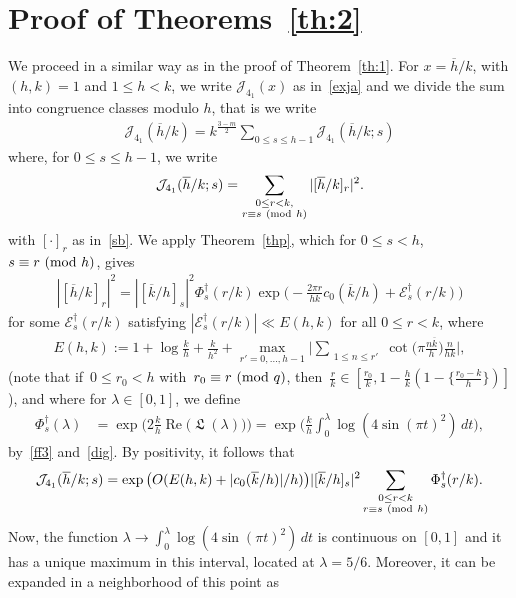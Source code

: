 \documentclass[11pt]{amsart}
\newcommand{\J}{\mathcal{J}}
\renewcommand{\mod}[1]{~\pr{\textnormal{mod}~#1}}
\newcommand{\Er}{{\mathcal E}}
\theoremstyle{definition}
\newcommand{\ssum}[1]{\sum_{\substack{#1}}}
\newcommand{\pr}[1]{\mathchoice{\left( #1\right)}{(#1)}{(#1)}{(#1)}}
\DeclareMathOperator{\Lie}{{\mathfrak L}}
\renewcommand\Re{\operatorname{Re}}
\newcommand{\1}{{\mathbf 1}}
\renewcommand{\bar}[1]{\overline{#1}}
\let\originalleft\left
\let\originalright\right
\renewcommand{\left}{\mathopen{}\mathclose\bgroup\originalleft}
\renewcommand{\right}{\aftergroup\egroup\originalright}
\numberwithin{equation}{section}
\begin{document}
\section{Proof of Theorems~\ref{th:2}}\label{pmt2}
We proceed in a similar way as in the proof of Theorem~\ref{th:1}. For $x=\bar h/k$, with $(h,k)=1$ and $1\leq h<k$, we write $ \J_{4_1}( x)$ as in~\eqref{exja} and we divide the sum into congruence classes modulo $h$, that is we write
\begin{align}\label{splj2}
  \J_{4_1}(\bar h/k) = k^{\frac{3-m}2} \sum_{0\leq s\leq h-1}\J_{4_1}(\bar h/k; s)
\end{align}
where, for $0\leq s\leq h-1$, we write
\begin{align}\label{splik2}
  \J_{4_1}(\bar h/k; s) =   \ssum{0\leq r<k,\\ r\equiv s \mod{h}}{| [ \bar h/k]_{r}|^2}.
\end{align}
with $[\cdot]_r$ as in~\eqref{sb}. We apply Theorem~\ref{thp}, which for $0\leq s<h$, $s\equiv r\mod h$, gives
\begin{align}\label{arf2}
  | [\overline{h}/k]_{r}|^2 = | [\bar k/h]_{s}|^2 \Phi_s^\dagger(r /k)\exp\Big(- \frac {2\pi r}{hk}c_0({\overline k}/h)+\Er^\dagger_s(r/k)\Big)
\end{align}
for some $\Er^\dagger_s(r/k)$ satisfying $|\Er^\dagger_s(r/k)|\ll E(h,k)$ for all $0\leq r<k$, where
\begin{align*}
  E(h,k):= 1+ \log \frac kh+\frac{k}{h^2}+\max_{r'=0,\dots, h-1}\Big|\ssum{1\leq n\leq r'}\cot\Big(\pi\frac{n\overline k }h\Big)\frac{ n}{hk}\Big|, \end{align*}
(note that if~$0\leq r_0 <h$ with~$r_0\equiv r \mod{q}$, then~$\frac{r}k \in[\frac{r_0}k, 1-\frac hk(1-\{\frac{r_0-k}h\})]$), and where for $\lambda\in[0,1]$, we define
\begin{align*} 
  \Phi_s^\dagger(\lambda) &= \exp\bigg(2\frac k{h}\Re \Big(\Lie(\lambda) \Big)\bigg)=\exp\bigg(\frac k{h}\int_0^\lambda\log(4\sin(\pi t)^2)\,dt\bigg),
\end{align*}
by~\eqref{ff3} and~\eqref{dig}.
By positivity, it follows that
\begin{align}\label{erfac}
  \J_{4_1}(\bar h/k; s)= \exp\big(O(E(h,k)+|c_0({\overline k}/h)|/h)\big)|[ \bar k/h]_{ s}|^2
  \ssum{0\leq r<k\\ r\equiv s \mod{h}}{ \Phi_s^\dagger(r/k)}.
\end{align}
Now, the function $\lambda\to \int_0^\lambda\log(4\sin(\pi t)^2)\,dt$ is continuous on $[0,1]$ and it has a unique maximum in this interval, located at $\lambda=5/6$. Moreover, it can be expanded in a neighborhood of this point as
\end{document}

